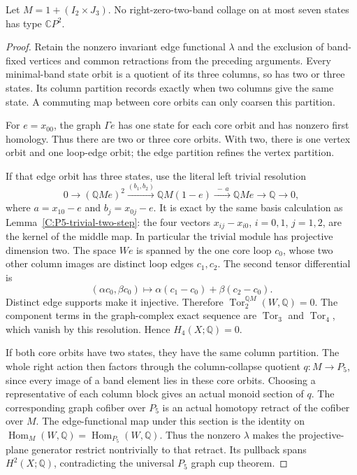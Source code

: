 \begin{lemma}
\label{C:two-by-three-seven-state-graph}
Let $M=1+(I_2\times J_3)$.  No right-zero-two-band
collage on at most seven states has type $\mathbb CP^2$.
\end{lemma}
\begin{proof}
Retain the nonzero invariant edge functional $\lambda$
and the exclusion of band-fixed vertices and common
retractions from the preceding arguments.  Every
minimal-band state orbit is a quotient of its three
columns, so has two or three states.  Its column
partition records exactly when two columns give the
same state.  A commuting map between core orbits can
only coarsen this partition.

For $e=x_{00}$, the graph $\Gamma e$ has one state for
each core orbit and has nonzero first homology.
Thus there are two or three core orbits.
With two, there is one vertex orbit and one loop-edge
orbit; the edge partition refines the vertex partition.

If that edge orbit has three states, use the literal
left trivial resolution
\[
 0\longrightarrow(\mathbb QM e)^2
 \xrightarrow{(b_1,b_2)}
 \mathbb QM(1-e)\xrightarrow{\ {-}\,a\ }
 \mathbb QM e\longrightarrow\mathbb Q\longrightarrow0,
\]
where $a=x_{10}-e$ and $b_j=x_{0j}-e$.
It is exact by the same basis calculation as
Lemma~\ref{C:P5-trivial-two-step}: the four vectors
$x_{ij}-x_{i0}$, $i=0,1$, $j=1,2$, are the kernel
of the middle map.  In particular the trivial module
has projective dimension two.
The space $We$ is spanned by the one core loop $c_0$,
whose two other column images are distinct loop edges
$c_1,c_2$.  The second tensor differential is
\[
 (\alpha c_0,\beta c_0)\longmapsto
       \alpha(c_1-c_0)+\beta(c_2-c_0).
\]
Distinct edge supports make it injective.  Therefore
$\operatorname{Tor}_2^{\mathbb QM}(W,\mathbb Q)=0$.
The component terms in the graph-complex exact sequence
are $\operatorname{Tor}_3$ and $\operatorname{Tor}_4$,
which vanish by this resolution.  Hence $H_4(X;\mathbb Q)=0$.

If both core orbits have two states, they have the same
column partition.  The whole right action then factors
through the column-collapse quotient $q:M\to P_5$,
since every image of a band element lies in these
core orbits.  Choosing a representative of each column
block gives an actual monoid section of $q$.
The corresponding graph cofiber over $P_5$ is an actual
homotopy retract of the cofiber over $M$.
The edge-functional map under this section is the
identity on
$\operatorname{Hom}_{M}(W,\mathbb Q)
=\operatorname{Hom}_{P_5}(W,\mathbb Q)$.
Thus the nonzero $\lambda$ makes the projective-plane
generator restrict nontrivially to that retract.
Its pullback spans $H^2(X;\mathbb Q)$, contradicting
the universal $P_5$ graph cup theorem.


\end{proof}
